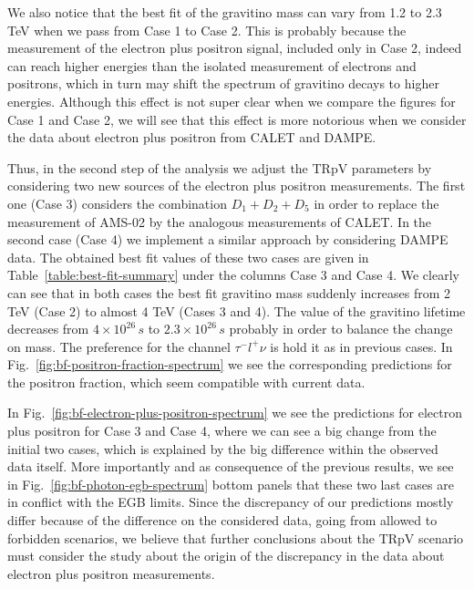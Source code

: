 \documentclass[a4paper,11pt]{article}
\begin{document}
We also notice that the best fit of the gravitino mass can vary from 1.2 to 2.3 TeV when we pass from Case 1 to Case 2. This is probably because the measurement of the electron plus positron signal, included only in Case 2, indeed can reach higher energies than the isolated measurement of electrons and positrons, which in turn may shift the spectrum of  gravitino decays to higher energies. Although this effect is not super clear when we compare the figures for Case 1 and Case 2, we will see that this effect is more notorious when we consider the data about electron plus positron from CALET and DAMPE.

Thus, in the second step of the analysis we adjust the TRpV parameters by considering two new sources of the electron plus positron measurements. The first one (Case 3) considers the combination $D_1+D_2+D_5$ in order to replace the measurement of AMS-02 by the analogous measurements of CALET. In the second case (Case 4) we implement a similar approach by considering DAMPE data. The obtained best fit values of these two cases are given in Table~\ref{table:best-fit-summary} under the columns Case 3 and Case 4. We clearly can see that in both cases the best fit gravitino mass suddenly increases from 2 TeV (Case 2) to almost 4 TeV (Cases 3 and 4). The value of the gravitino lifetime decreases from $4\times10
^{26}\,s$ to $2.3\times10^{26}\,s$ probably in order to balance the change on mass. The preference for the channel $\tau^{-}l^{+}\nu$ is hold it as in previous cases. In Fig.~\ref{fig:bf-positron-fraction-spectrum} we see the corresponding predictions for the positron fraction, which seem compatible with current data. 

In Fig.~\ref{fig:bf-electron-plus-positron-spectrum} we see the predictions for electron plus positron for Case 3 and Case 4, where we can see a big change from the initial two cases, which is explained by the big difference within the observed data itself. More importantly and as consequence of the previous results, we see in Fig.~\ref{fig:bf-photon-egb-spectrum} bottom panels that these two last cases are in conflict with the EGB limits. Since the discrepancy of our predictions mostly differ because of the difference on the considered data, going from allowed to forbidden scenarios, we believe that further conclusions about the TRpV scenario must consider the study about the origin of the discrepancy in the data about electron plus positron measurements. 
\end{document}
